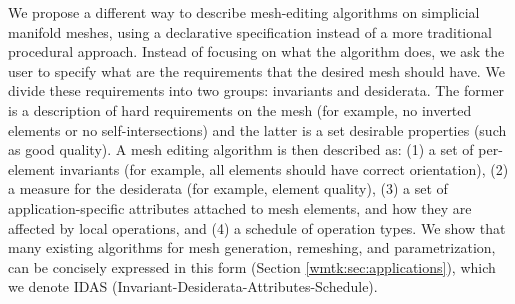 We propose a different way to describe mesh-editing algorithms on simplicial manifold meshes, using a declarative specification instead of a more traditional procedural approach. Instead of focusing on what the algorithm does, we ask the user to specify what are the requirements that the desired mesh should have. We divide these requirements into two groups: invariants and desiderata. The former is a description of hard requirements on the mesh (for example, no inverted elements or no self-intersections) and the latter is a set desirable properties (such as good quality). A mesh editing algorithm is then described as: (1) a set of per-element invariants (for example, all elements should have correct orientation), (2) a measure for the desiderata (for example, element quality), (3) a set of application-specific attributes attached to mesh elements, and how they are affected by local operations, and (4) a schedule of operation types. We show that many existing algorithms for mesh generation, remeshing, and parametrization, can be concisely expressed in this form (Section \ref{wmtk:sec:applications}), which we denote IDAS (Invariant-Desiderata-Attributes-Schedule).

